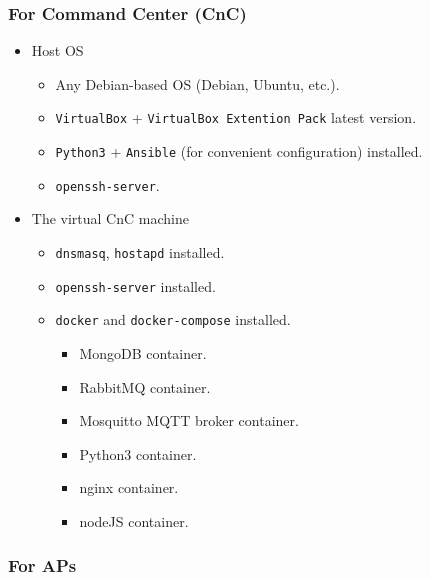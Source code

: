 \hypertarget{for-command-center-cnc}{%
\subsubsection{For Command Center (CnC)}\label{for-command-center-cnc}}

\begin{itemize}
\tightlist
\item
  Host OS

  \begin{itemize}
  \tightlist
  \item
    Any Debian-based OS (Debian, Ubuntu, etc.).
  \item
    \texttt{VirtualBox} + \texttt{VirtualBox\ Extention\ Pack} latest
    version.
  \item
    \texttt{Python3} + \texttt{Ansible} (for convenient configuration) installed.
  \item
    \texttt{openssh-server}.
  \end{itemize}
\item
  The virtual CnC machine

  \begin{itemize}
  \tightlist
  \item
    \texttt{dnsmasq}, \texttt{hostapd} installed.
  \item
    \texttt{openssh-server} installed.
  \item
    \texttt{docker} and \texttt{docker-compose} installed.

    \begin{itemize}
    \tightlist
    \item
      MongoDB container.
    \item
      RabbitMQ container.
    \item
      Mosquitto MQTT broker container.
    \item
      Python3 container.
    \item
      nginx container.
    \item
      nodeJS container.
    \end{itemize}
  \end{itemize}
\end{itemize}

\hypertarget{for-aps}{%
\subsubsection{For APs}\label{for-aps}}

